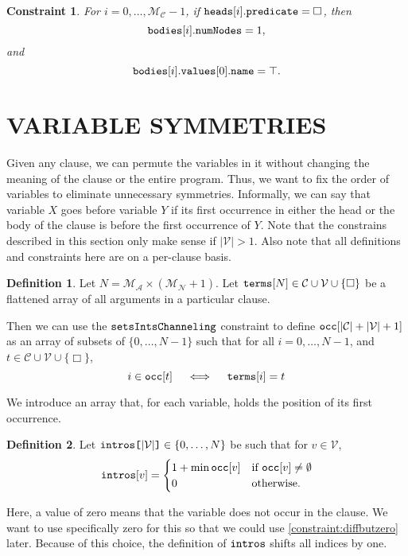 \documentclass[letterpaper]{article}
\newtheorem{constraint}{Constraint}
\theoremstyle{definition}
\newtheorem{definition}{Definition}
\newcommand{\variable}[1]{\texttt{\textup{#1}}}
\newcommand{\arrayd}[3]{\variable{{#1}[}{#2}\variable{]} \in {#3}}
\newcommand{\variables}{\mathcal{V}}
\newcommand{\constants}{\mathcal{C}}
\newcommand{\maxArity}{\mathcal{M}_{\mathcal{A}}}
\newcommand{\maxNumNodes}{\mathcal{M}_{\mathcal{N}}}
\newcommand{\maxNumClauses}{\mathcal{M}_{\mathcal{C}}}
\begin{document}
\begin{constraint}
  For $i = 0, \dots, \maxNumClauses{} - 1$, if
  $\variable{heads}[i].\variable{predicate} = \Box$, then
  \[
    \variable{bodies}[i].\variable{numNodes} = 1,
  \]
  and
  \[
    \variable{bodies}[i].\variable{values}[0].\variable{name} =
    \top.
  \]
\end{constraint}

\section{VARIABLE SYMMETRIES} \label{sec:variable_symmetry}

Given any clause, we can permute the variables in it without changing the
meaning of the clause or the entire program. Thus, we want to fix the order of
variables to eliminate unnecessary symmetries. Informally, we can say that
variable $X$ goes before variable $Y$ if its first occurrence in either the head
or the body of the clause is before the first occurrence of $Y$. Note that the
constrains described in this section only make sense if $|\variables| > 1$. Also
note that all definitions and constraints here are on a per-clause basis.

\begin{definition}
  Let $N = \maxArity{} \times (\maxNumNodes{} + 1)$. Let
  $\variable{terms}[N] \in \constants{} \cup \variables{} \cup \{ \Box
  \}$ be a flattened array of all arguments in a particular clause.

  Then we can use the $\variable{setsIntsChanneling}$ constraint
  to define $\variable{occ}[|\constants{}| + |\variables{}| + 1]$ as an
  array of subsets of $\{ 0, \dots, N-1 \}$ such that for all $i = 0, \dots, N
  - 1$, and $t \in \constants{} \cup \variables{} \cup \{ \Box \}$,
  \[
    i \in \variable{occ}[t] \quad \iff \quad
    \variable{terms}[i] = t
  \]
\end{definition}

We introduce an array that, for each variable, holds the position of its first
occurrence.
\begin{definition}
  Let $\arrayd{intros}{|\variables{}|}{\{ 0, \dots, N \}}$ be such that
  for $v \in \variables{}$,
  \[
    \variable{intros}[v] = \begin{cases}
      1 + \min \variable{occ}[v] & \text{if }
      \variable{occ}[v] \ne \emptyset\\
      0 & \text{otherwise.}
    \end{cases}
  \]
\end{definition}
Here, a value of zero means that the variable does not occur in the clause. We
want to use specifically zero for this so that we could use
\cref{constraint:diffbutzero} later. Because of this choice, the definition of
$\variable{intros}$ shifts all indices by one.
\end{document}
